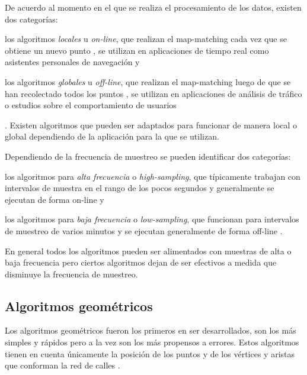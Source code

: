 De acuerdo al momento en el que se realiza el procesamiento de los datos, existen dos categorías: \begin{enumerate*}[1)] \item los algoritmos \emph{locales} u \emph{on-line}, que realizan el map-matching cada vez que se obtiene un nuevo punto \cite{thiagarajan2009vtrack,thiagarajan2011accurate,greenfeld2002matching,quddus2003general,quddus2006high}, se utilizan en aplicaciones de tiempo real como asistentes personales de navegación y \item los algoritmos \emph{globales} u \emph{off-line}, que realizan el map-matching luego de que se han recolectado todos los puntos \cite{lou2009map,yuan2010interactive}, se utilizan en aplicaciones de análisis de tráfico o estudios sobre el comportamiento de usuarios\end{enumerate*}. Existen algoritmos que pueden ser adaptados para funcionar de manera local o global dependiendo de la aplicación para la que se utilizan.

Dependiendo de la frecuencia de muestreo se pueden identificar dos categorías: \begin{enumerate*}[1)] \item los algoritmos para \emph{alta frecuencia} o \emph{high-sampling}, que típicamente trabajan con intervalos de muestra en el rango de los pocos segundos y generalmente se ejecutan de forma on-line \cite{greenfeld2002matching,quddus2003general,quddus2006high} y \item los algoritmos para \emph{baja frecuencia} o \emph{low-sampling},  que funcionan para intervalos de muestreo de varios minutos y se ejecutan generalmente de forma off-line \cite{lou2009map,yuan2010interactive}. \end{enumerate*} En general todos los algoritmos pueden ser alimentados con muestras de alta o baja frecuencia pero ciertos algoritmos dejan de ser efectivos a medida que disminuye la frecuencia de muestreo.

\subsection{Algoritmos geométricos}

Los algoritmos geométricos fueron los primeros en ser desarrollados, son los más simples y rápidos pero a la vez son los más propensos a errores. Estos algoritmos tienen en cuenta únicamente la posición de los puntos y de los vértices y aristas que conforman la red de calles \cite{quddus2007current}.

